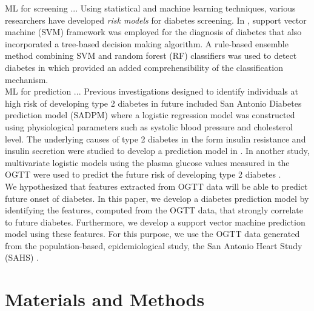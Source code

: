 \documentclass[journal,comsoc]{IEEEtran}
\renewcommand{\^}{\hat}  %
\begin{document}
ML for screening ... Using statistical and machine learning techniques, various researchers have developed \emph{risk models} for diabetes screening. In \cite{barakat_intelligible_2010}, support vector machine (SVM) framework was employed for the diagnosis of diabetes that also incorporated a tree-based decision making algorithm. A rule-based ensemble method combining SVM and random forest (RF) classifiers was used to detect diabetes in \cite{han_rule_2015} which provided an added comprehensibility of the classification mechanism.\\
ML for prediction ... Previous investigations designed to identify individuals at high risk of developing type 2 diabetes in future included San Antonio Diabetes prediction model (SADPM) \cite{stern2002identification} where a logistic regression model was constructed using physiological parameters such as systolic blood pressure and cholesterol level. The underlying causes of type 2 diabetes in the form insulin resistance and insulin secretion were studied to develop a prediction model in \cite{abdul-ghani_what_2007}. In another study,  multivariate logistic models using the plasma glucose values measured in the OGTT were used to predict the future risk of developing type 2 diabetes \cite{abdul-ghani_two-step_2011, abdul2009fasting}.\\

We hypothesized that features extracted from OGTT data will be able to predict future onset of diabetes. In this paper, we develop a diabetes prediction model by identifying the features, computed from the OGTT data, that strongly correlate to future diabetes. Furthermore, we develop a support vector machine prediction model using these features. For this purpose, we use the OGTT data generated from the population-based, epidemiological study, the San Antonio Heart Study (SAHS) \cite{burke_rapid_1999, lorenzo_trend_2006}.
%
\section{Materials and Methods}
%
\end{document}
